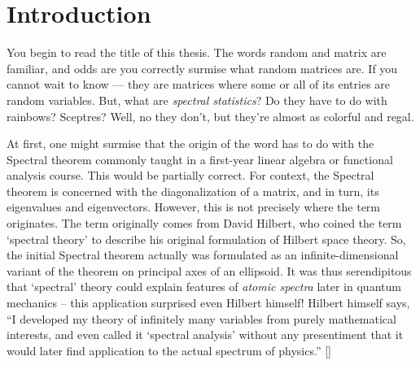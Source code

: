 
  \chapter*{Introduction}


You begin to read the title of this thesis. The words random and matrix are familiar, and odds are you correctly surmise what random matrices are.
If you cannot wait to know --- they are matrices where some or all of its entries are random variables.
But, what are \textit{spectral statistics}? Do they have to do with rainbows? Sceptres? Well, no they don’t, but they’re almost as colorful and regal.

At first, one might surmise that the origin of the word has to do with the Spectral theorem commonly taught in a first-year linear algebra or functional analysis course.
This would be partially correct. For context, the Spectral theorem is concerned with the diagonalization of a matrix, and in turn, its eigenvalues
and eigenvectors. However, this is not precisely where the term originates.
The term originally comes from David Hilbert, who coined the term `spectral theory' to describe his original formulation of Hilbert space theory.
So, the initial Spectral theorem actually was formulated as an infinite-dimensional variant of the theorem on principal axes of an ellipsoid.
It was thus serendipitous that `spectral' theory could explain features of \textit{atomic spectra} later in quantum mechanics -- this application surprised even Hilbert himself!
Hilbert himself says, ``I developed my theory of infinitely many variables from purely mathematical interests,
and even called it `spectral analysis' without any presentiment that it would later find application to the actual spectrum of physics.'' [\cite{steen}]

